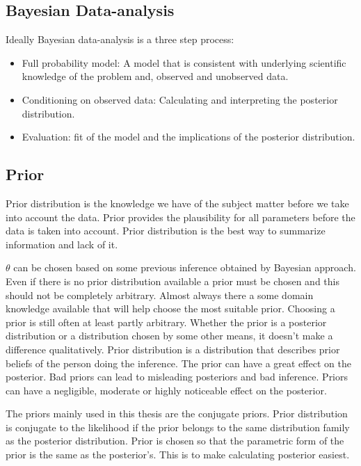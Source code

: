 \subsection{Bayesian Data-analysis}\label{BayesianDataAnalysis}
Ideally Bayesian data-analysis is a three step process: 
\begin{itemize}
    \item Full probability model: A model that is consistent with underlying scientific knowledge of the problem and, observed and unobserved data. 
    \item Conditioning on observed data: Calculating and interpreting the posterior distribution.
    \item Evaluation: fit of the model and the implications of the posterior distribution.
\end{itemize}\cite{Gel2014BayesianDA}

\subsection{Prior}\label{Prior}
Prior distribution is the knowledge we have of the subject matter before we take into account the data.\cite{Box1973BayesianII} Prior provides the plausibility for all parameters before the data is taken into account. \cite{Mcelreath2015StatisticalRA}\cite{Robert2007TheBC} Prior distribution is the best way to summarize information and lack of it.\cite{Robert2007TheBC} 

$\theta$ can be chosen based on some previous inference obtained by Bayesian approach. Even if there is no prior distribution available a prior must be chosen and this should not be completely arbitrary. Almost always there a some domain knowledge available that will help choose the most suitable prior.\cite{Mcelreath2015StatisticalRA} Choosing a prior is still often at least partly arbitrary.\cite{Robert2007TheBC} Whether the prior is a posterior distribution or a distribution chosen by some other means, it doesn't make a difference qualitatively. Prior distribution is a distribution that describes prior beliefs of the person doing the inference.\cite{Lindley1990The1W} The prior can have a great effect on the posterior. Bad priors can lead to misleading posteriors and bad inference.\cite{Mcelreath2015StatisticalRA} Priors can have a negligible, moderate or highly noticeable effect on the posterior.\cite{Robert2007TheBC}

The priors mainly used in this thesis are the conjugate priors. Prior distribution is conjugate to the likelihood if the prior belongs to the same distribution family as the posterior distribution. Prior is chosen so that the parametric form of the prior is the same as the posterior's. This is to make calculating posterior easiest. \cite{SUGIYAMA2016185}

